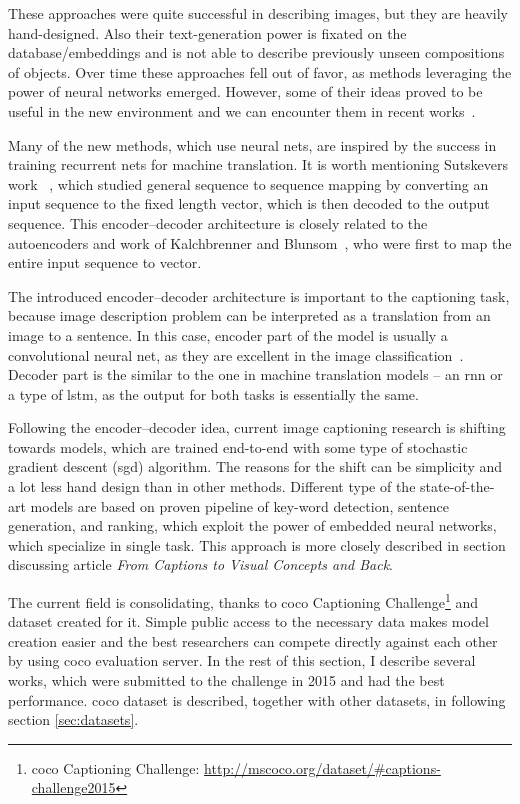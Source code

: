 These approaches were quite successful in describing images, but they are heavily hand-designed. Also their text-generation power is fixated on the database/embeddings and is not able to describe previously unseen compositions of objects. Over time these approaches fell out of favor, as methods leveraging the power of neural networks emerged. However, some of their ideas proved to be useful in the new environment and we can encounter them in recent works~\cite{DBLP:journals/corr/FangGISDDGHMPZZ14}.

Many of the new methods, which use neural nets, are inspired by the success in training recurrent nets for machine translation. It is worth mentioning Sutskevers work ~\cite{DBLP:journals/corr/SutskeverVL14}, which studied general sequence to sequence mapping by converting an input sequence to the fixed length vector, which is then decoded to the output sequence. This encoder--decoder architecture is closely related to the autoencoders and work of Kalchbrenner and Blunsom~\cite{conf/emnlp/KalchbrennerB13}, who were first to map the entire input sequence to vector.

The introduced encoder--decoder architecture is important to the captioning task, because image description problem can be interpreted as a translation from an image to a sentence. In this case, encoder part of the model is usually a convolutional neural net, as they are excellent in the image classification~\cite{DBLP:journals/corr/SzegedyLJSRAEVR14}. Decoder part is the similar to the one in machine translation models -- an \gls{rnn} or a type of \gls{lstm}, as the output for both tasks is essentially the same.

Following the encoder--decoder idea, current image captioning research is shifting towards models, which are trained end-to-end with some type of stochastic gradient descent (\gls{sgd}) algorithm. The reasons for the shift can be simplicity and a lot less hand design than in other methods. Different type of the state-of-the-art models are based on proven pipeline of key-word detection, sentence generation, and ranking, which exploit the power of embedded neural networks, which specialize in single task. This approach is more closely described in section discussing article \emph{From Captions to Visual Concepts and Back}.

The current field is consolidating, thanks to \gls{coco} Captioning Challenge\footnote{\gls{coco} Captioning Challenge: \url{http://mscoco.org/dataset/\#captions-challenge2015}} and dataset created for it. Simple public access to the necessary data makes model creation easier and the best researchers can compete directly against each other by using \gls{coco} evaluation server. In the rest of this section, I describe several works, which were submitted to the challenge in 2015 and had the best performance. \gls{coco} dataset is described, together with other datasets, in following section \ref{sec:datasets}.


